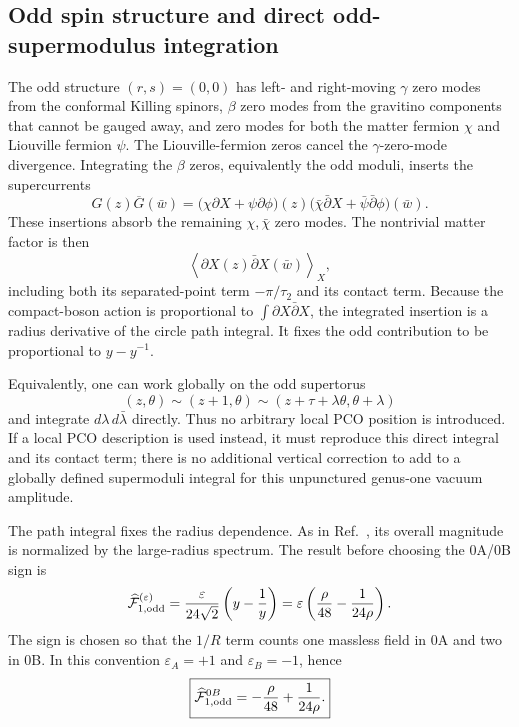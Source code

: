 \documentclass[11pt]{article}
\begin{document}
\subsection{Odd spin structure and direct odd-supermodulus integration}

The odd structure $(r,s)=(0,0)$ has left- and right-moving $\gamma$ zero
modes from the conformal Killing spinors, $\beta$ zero modes from the
gravitino components that cannot be gauged away, and zero modes for both the
matter fermion $\chi$ and Liouville fermion $\psi$.  The Liouville-fermion
zeros cancel the $\gamma$-zero-mode divergence.  Integrating the $\beta$
zeros, equivalently the odd moduli, inserts the supercurrents
\begin{equation}
 G(z)\overline G(\bar w)
 =\big(\chi\partial X+\psi\partial\phi\big)(z)
  \big(\bar\chi\bar\partial X+\bar\psi\bar\partial\phi\big)(\bar w).
 \label{eq:odd-supercurrent-insertion}
\end{equation}
These insertions absorb the remaining $\chi,\bar\chi$ zero modes.  The
nontrivial matter factor is then
\begin{equation}
 \left\langle\partial X(z)\bar\partial X(\bar w)\right\rangle_X,
 \label{eq:odd-matter-correlator}
\end{equation}
including both its separated-point term $-\pi/\tau_2$ and its contact term.
Because the compact-boson action is proportional to
$\int\partial X\bar\partial X$, the integrated insertion is a radius
derivative of the circle path integral.  It fixes the odd contribution to
be proportional to $y-y^{-1}$.

Equivalently, one can work globally on the odd supertorus
\begin{equation}
 (z,\theta)\sim(z+1,\theta)
 \sim(z+\tau+\lambda\theta,\theta+\lambda)
 \label{eq:odd-supertorus}
\end{equation}
and integrate $d\lambda\,d\bar\lambda$ directly.  Thus no arbitrary local
PCO position is introduced.  If a local PCO description is used instead,
it must reproduce this direct integral and its contact term; there is no
additional vertical correction to add to a globally defined supermoduli
integral for this unpunctured genus-one vacuum amplitude.

The path integral fixes the radius dependence.  As in
Ref.~\cite{DouglasEtAl2003NewHat}, its overall magnitude is normalized by
the large-radius spectrum.  The result before choosing the 0A/0B sign is
\begin{equation}
 \widehat{\mathcal F}_{1,\rm odd}^{(\varepsilon)}
 =\frac{\varepsilon}{24\sqrt2}\left(y-\frac1y\right)
 =\varepsilon\left(\frac\rho{48}-\frac1{24\rho}\right).
 \label{eq:odd-spin-general}
\end{equation}
The sign is chosen so that the $1/R$ term counts one massless field in 0A
and two in 0B.  In this convention $\varepsilon_A=+1$ and
$\varepsilon_B=-1$, hence
\begin{equation}
 \boxed{
 \widehat{\mathcal F}_{1,\rm odd}^{0B}
 =-\frac\rho{48}+\frac1{24\rho}.}
 \label{eq:odd-spin-density}
\end{equation}
\end{document}
